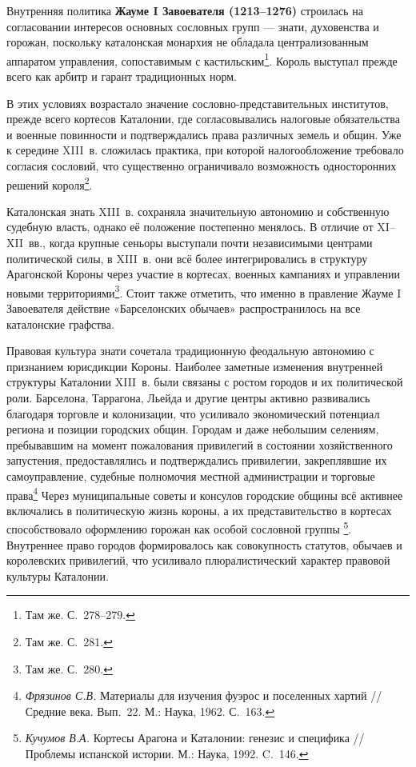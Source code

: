 Внутренняя политика \textbf{Жауме I Завоевателя (1213--1276) }строилась на согласовании интересов основных сословных групп --- знати, духовенства и горожан, поскольку каталонская монархия не обладала централизованным аппаратом управления, сопоставимым с кастильским\footnote{Там же. С.~278--279.}. Король выступал прежде всего как арбитр и гарант традиционных норм.

В этих условиях возрастало значение сословно-представительных институтов, прежде всего кортесов Каталонии, где согласовывались налоговые обязательства и военные повинности и подтверждались права различных земель и общин. Уже к середине XIII~в. сложилась практика, при которой налогообложение требовало согласия сословий, что существенно ограничивало возможность односторонних решений короля\footnote{Там же. С.~281.}.

Каталонская знать XIII~в. сохраняла значительную автономию и собственную судебную власть, однако её положение постепенно менялось. В отличие от XI--XII~вв., когда крупные сеньоры выступали почти независимыми центрами политической силы, в XIII~в. они всё более интегрировались в структуру Арагонской Короны через участие в кортесах, военных кампаниях и управлении новыми территориями\footnote{Там же. С.~280.}. Стоит также отметить, что именно в правление Жауме I Завоевателя действие «Барселонских обычаев» распространилось на все каталонские графства.

Правовая культура знати сочетала традиционную феодальную автономию с признанием юрисдикции Короны. Наиболее заметные изменения внутренней структуры Каталонии XIII~в. были связаны с ростом городов и их политической роли. Барселона, Таррагона, Льейда и другие центры активно развивались благодаря торговле и колонизации, что усиливало экономический потенциал региона и позиции городских общин. Городам и даже небольшим селениям, пребывавшим на момент пожалования привилегий в состоянии хозяйственного запустения, предоставлялись и подтверждались привилегии, закреплявшие их самоуправление, судебные полномочия местной администрации и торговые права\footnote{\emph{Фрязинов С.В.} Материалы для изучения фуэрос и поселенных хартий // Средние века. Вып.~22. М.: Наука, 1962. С.~163.} Через муниципальные советы и консулов городские общины всё активнее включались в политическую жизнь короны, а их представительство в кортесах способствовало оформлению горожан как особой сословной группы\textsuperscript{ }\footnote{\emph{Кучумов В.А. }Кортесы Арагона и Каталонии: генезис и специфика // Проблемы испанской истории. М.: Наука, 1992. C.~146.}. Внутреннее право городов формировалось как совокупность статутов, обычаев и королевских привилегий, что усиливало плюралистический характер правовой культуры Каталонии.

